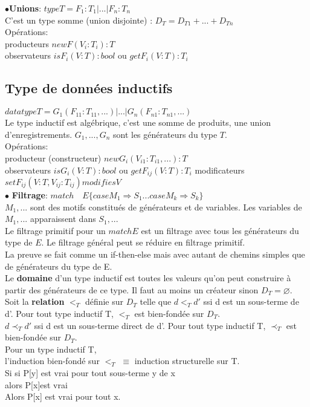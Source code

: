 $\bullet$\textbf{Unions}: $type T = F_1:T_1|...|F_n:T_n$\\
C'est un type somme (union disjointe) : $D_T = D_{T1}+...+D_{Tn}$\\
Opérations:\\
producteurs $newF(V_i:T_i):T$\\
observateurs $isF_i(V:T):bool$ ou $getF_i(V:T):T_i$
\subsection{Type de données inductifs}

$datatype T = G_1(F_{11}:T_{11},...)|...|G_n(F_{n1}:T_{n1},...)$\\
Le type inductif est algébrique, c'est une somme de produits, une union d'enregistrements. $G_1,...,G_n$ sont les générateurs du type $T$.\\
Opérations:\\
producteur (constructeur) $newG_i(V_{i1}:T_{i1},...):T$\\
observateurs $isG_i(V:T):bool$ ou $getF_{ij}(V:T):T_i$
modificateurs $setF_{ij} (V:T,V_{ij}:T_{ij}) modifies V$\\

$\bullet$ \textbf{Filtrage}: $match \quad E\{case M_1 \Rightarrow S_1 ... case M_k \Rightarrow S_k\}$\\
$M_1,...$ sont des motifs constitués de générateurs et de variables. Les variables de $M_1,...$ apparaissent dans $S_1, ...$\\
Le filtrage primitif pour un $match E$ est un filtrage avec tous les générateurs du type de $E$. Le filtrage général peut se réduire en filtrage primitif.\\
La preuve se fait comme un if-then-else mais avec autant de chemins simples que de générateurs du type de E.\\

Le \textbf{domaine} d'un type inductif est toutes les valeurs qu'on peut construire à partir des générateurs de ce type. Il faut au moins un créateur sinon $D_T = \varnothing$. \\

Soit la \textbf{relation} $<_T$ définie sur $D_T$ telle que $d<_T d'$ ssi d est un sous-terme de d'. Pour tout type inductif T, $<_T$ est bien-fondée sur $D_T$.\\
$d\prec_T d'$ ssi d est un sous-terme direct de d'. Pour tout type inductif T, $\prec_T$ est bien-fondée sur $D_T$.\\
Pour un type inductif T,\\
l'induction bien-fondé sur $<_T$ $\equiv$ induction structurelle sur T.\\
Si si P[y] est vrai pour tout sous-terme y de x\\
alors P[x]est vrai\\
Alors P[x] est vrai pour tout x.\\

